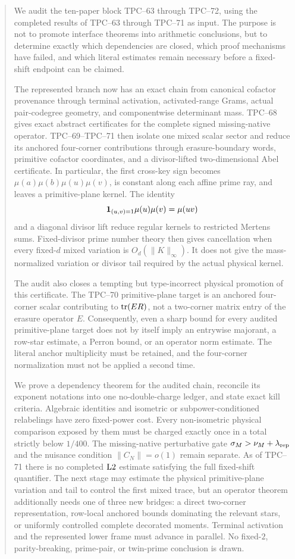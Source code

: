 \begin{abstract}
We audit the ten-paper block TPC--63 through TPC--72, using the completed
results of TPC--63 through TPC--71 as input.  The purpose is not to promote
interface theorems into arithmetic conclusions, but to determine exactly
which dependencies are closed, which proof mechanisms have failed, and
which literal estimates remain necessary before a fixed-shift endpoint can
be claimed.

The represented branch now has an exact chain from canonical cofactor
provenance through terminal activation, activated-range Grams, actual
pair-codegree geometry, and componentwise determinant mass.  TPC--68 gives
exact abstract certificates for the complete signed missing-native
operator.  TPC--69--TPC--71 then isolate one mixed scalar sector and reduce
its anchored four-corner contributions through erasure-boundary words,
primitive cofactor coordinates, and a divisor-lifted two-dimensional Abel
certificate.  In particular, the first cross-key sign becomes
\(\mu(a)\mu(b)\mu(u)\mu(v)\), is constant along each affine prime ray, and
leaves a primitive-plane kernel.  The identity
\[
 \one_{(u,v)=1}\mu(u)\mu(v)=\mu(uv)
\]
and a diagonal divisor lift reduce regular kernels to restricted Mertens
sums.  Fixed-divisor prime number theory then gives cancellation when every
fixed-\(d\) mixed variation is
\(O_d(\|K\|_\infty)\).  It does not give the mass-normalized variation or
divisor tail required by the actual physical kernel.

The audit also closes a tempting but type-incorrect physical promotion of
this certificate.  The TPC--70 primitive-plane target is an anchored
four-corner scalar contributing to \(\tr(ER)\), not a two-corner matrix
entry of the erasure operator \(E\).  Consequently, even a sharp bound for
every audited primitive-plane target does not by itself imply an entrywise
majorant, a row-star estimate, a Perron bound, or an operator norm estimate.
The literal anchor multiplicity must be retained, and the four-corner
normalization must not be applied a second time.

We prove a dependency theorem for the audited chain, reconcile its exponent
notations into one no-double-charge ledger, and state exact kill criteria.
Algebraic identities and isometric or subpower-conditioned relabelings have
zero fixed-power cost.  Every non-isometric physical comparison exposed by
them must be charged exactly once in a total strictly below \(1/400\).
The missing-native perturbative gate
\(\sigma_M>\nu_M+\lambda_{\rm rep}\) and the nuisance condition
\(\|C_N\|=o(1)\) remain separate.  As of TPC--71 there is no completed
\(\Ltwo\) estimate satisfying the full fixed-shift quantifier.  The next
stage may estimate the physical primitive-plane variation and tail to
control the first mixed trace, but an operator theorem additionally needs
one of three new bridges: a direct two-corner representation, row-local
anchored bounds dominating the relevant stars, or uniformly controlled
complete decorated moments.  Terminal activation and the represented lower
frame must advance in parallel.  No
fixed-\(2\), parity-breaking, prime-pair, or twin-prime conclusion is drawn.
\end{abstract}
